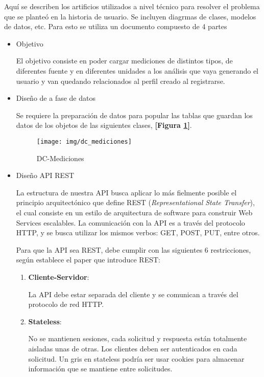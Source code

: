 Aquí se describen los artificios utilizados a nivel técnico para resolver el problema que se planteó en la historia de usuario. Se incluyen diagrmas de clases, modelos de datos, etc. Para esto se utiliza un documento compuesto de 4 partes
\begin{itemize}
\item Objetivo

El objetivo consiste en poder cargar mediciones de distintos tipos, de diferentes fuente y en diferentes unidades a los análisis que vaya generando el usuario y van quedando relacionados al perfil creado al registrarse.

\item Diseño de a fase de datos

Se requiere la preparación de datos para popular las tablas que guardan los datos de los objetos de las siguientes clases, \textbf{[Figura \ref{clases-doc-prog}]}.

    \begin{figure}[h]
        \centering
        \texttt{[image: img/dc\_mediciones]}
        \caption{DC-Mediciones}
		\label{clases-doc-prog}
    \end{figure}

\newpage

\item Diseño API REST


La estructura de nuestra API busca aplicar lo más fielmente posible el principio arquitectónico que define REST (\textit{Representational State Transfer}), el cual consiste en un estilo de arquitectura de software para construir Web Services escalables.
La comunicación con la API es a través del protocolo HTTP, y se busca utilizar los mismos verbos: GET, POST, PUT, entre otros.

Para que la API sea REST, debe cumplir con las siguientes 6 restricciones, según establece el paper que introduce REST:
\begin{enumerate}
	\item \textbf{Cliente-Servidor}:
    
    La API debe estar separada del cliente y se comunican a través del protocolo de red HTTP.
    
    \item \textbf{Stateless}:
    
    No se mantienen sesiones, cada solicitud y respuesta están totalmente aisladas unas de otras. Los clientes deben ser autenticados en cada solicitud. Un gris en stateless podría ser usar cookies para almacenar información que se mantiene entre solicitudes.
    

\end{enumerate}
\end{itemize}
